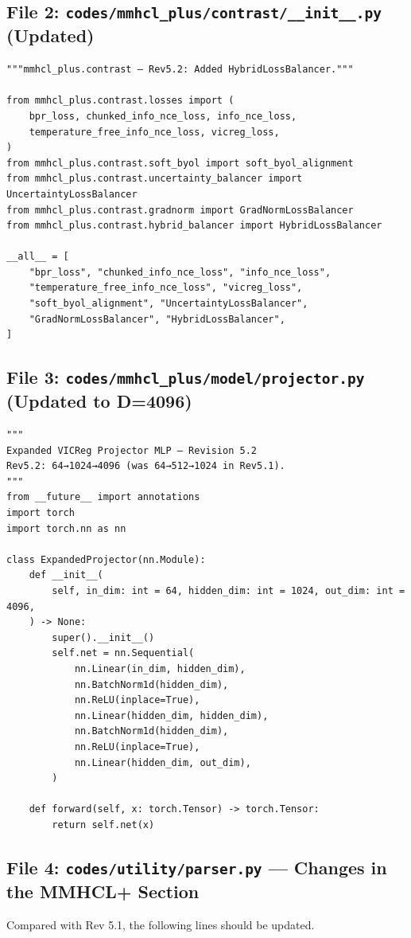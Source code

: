 \documentclass[11pt,a4paper]{article}
\begin{document}
\subsection{File 2: \texttt{codes/mmhcl\_plus/contrast/\_\_init\_\_.py} (Updated)}
\begin{lstlisting}[style=pythonstyle]
"""mmhcl_plus.contrast — Rev5.2: Added HybridLossBalancer."""

from mmhcl_plus.contrast.losses import (
    bpr_loss, chunked_info_nce_loss, info_nce_loss,
    temperature_free_info_nce_loss, vicreg_loss,
)
from mmhcl_plus.contrast.soft_byol import soft_byol_alignment
from mmhcl_plus.contrast.uncertainty_balancer import UncertaintyLossBalancer
from mmhcl_plus.contrast.gradnorm import GradNormLossBalancer
from mmhcl_plus.contrast.hybrid_balancer import HybridLossBalancer

__all__ = [
    "bpr_loss", "chunked_info_nce_loss", "info_nce_loss",
    "temperature_free_info_nce_loss", "vicreg_loss",
    "soft_byol_alignment", "UncertaintyLossBalancer",
    "GradNormLossBalancer", "HybridLossBalancer",
]
\end{lstlisting}

\subsection{File 3: \texttt{codes/mmhcl\_plus/model/projector.py} (Updated to D=4096)}
\begin{lstlisting}[style=pythonstyle]
"""
Expanded VICReg Projector MLP — Revision 5.2
Rev5.2: 64→1024→4096 (was 64→512→1024 in Rev5.1).
"""
from __future__ import annotations
import torch
import torch.nn as nn

class ExpandedProjector(nn.Module):
    def __init__(
        self, in_dim: int = 64, hidden_dim: int = 1024, out_dim: int = 4096,
    ) -> None:
        super().__init__()
        self.net = nn.Sequential(
            nn.Linear(in_dim, hidden_dim),
            nn.BatchNorm1d(hidden_dim),
            nn.ReLU(inplace=True),
            nn.Linear(hidden_dim, hidden_dim),
            nn.BatchNorm1d(hidden_dim),
            nn.ReLU(inplace=True),
            nn.Linear(hidden_dim, out_dim),
        )

    def forward(self, x: torch.Tensor) -> torch.Tensor:
        return self.net(x)
\end{lstlisting}

\subsection{File 4: \texttt{codes/utility/parser.py} --- Changes in the MMHCL+ Section}
Compared with Rev 5.1, the following lines should be updated.
\end{document}
